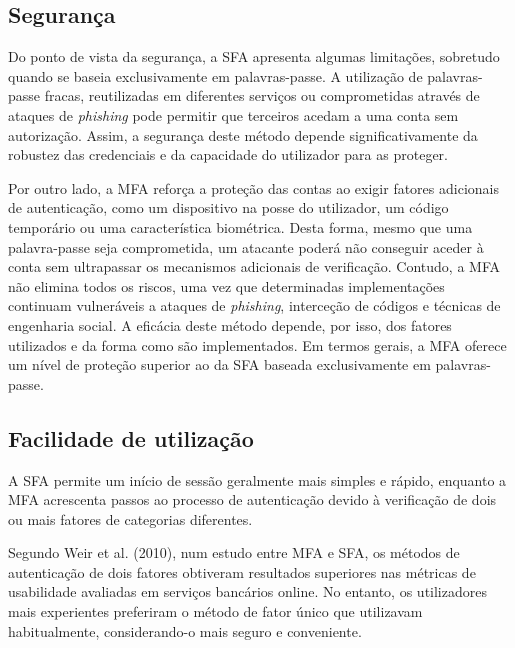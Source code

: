 \subsection{Segurança}

\hspace{1cm} Do ponto de vista da segurança, a SFA apresenta algumas limitações, sobretudo quando se baseia exclusivamente em palavras-passe. A utilização de palavras-passe fracas, reutilizadas em diferentes serviços ou comprometidas através de ataques de \textit{phishing} pode permitir que terceiros acedam a uma conta sem autorização. Assim, a segurança deste método depende significativamente da robustez das credenciais e da capacidade do utilizador para as proteger.

\hspace{1cm} Por outro lado, a MFA reforça a proteção das contas ao exigir fatores adicionais de autenticação, como um dispositivo na posse do utilizador, um código temporário ou uma característica biométrica. Desta forma, mesmo que uma palavra-passe seja comprometida, um atacante poderá não conseguir aceder à conta sem ultrapassar os mecanismos adicionais de verificação. Contudo, a MFA não elimina todos os riscos, uma vez que determinadas implementações continuam vulneráveis a ataques de \textit{phishing}, interceção de códigos e técnicas de engenharia social. A eficácia deste método depende, por isso, dos fatores utilizados e da forma como são implementados. Em termos gerais, a MFA oferece um nível de proteção superior ao da SFA baseada exclusivamente em palavras-passe.

\subsection{Facilidade de utilização}

\hspace{1cm} A SFA permite um início de sessão geralmente mais simples e rápido, enquanto a MFA acrescenta passos ao processo de autenticação devido à verificação de dois ou mais fatores de categorias diferentes.

\hspace{1cm} Segundo Weir et al. (2010), num estudo entre MFA e SFA, os métodos de autenticação de dois fatores obtiveram resultados superiores nas métricas de usabilidade avaliadas em serviços bancários online. No entanto, os utilizadores mais experientes preferiram o método de fator único que utilizavam habitualmente, considerando-o mais seguro e conveniente.

